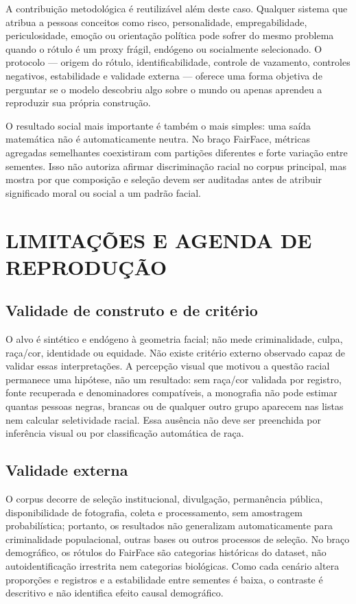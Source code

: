 A contribuição metodológica é reutilizável além deste caso. Qualquer sistema que atribua a pessoas conceitos como risco, personalidade, empregabilidade, periculosidade, emoção ou orientação política pode sofrer do mesmo problema quando o rótulo é um proxy frágil, endógeno ou socialmente selecionado. O protocolo --- origem do rótulo, identificabilidade, controle de vazamento, controles negativos, estabilidade e validade externa --- oferece uma forma objetiva de perguntar se o modelo descobriu algo sobre o mundo ou apenas aprendeu a reproduzir sua própria construção.

O resultado social mais importante é também o mais simples: uma saída matemática não é automaticamente neutra. No braço FairFace, métricas agregadas semelhantes coexistiram com partições diferentes e forte variação entre sementes. Isso não autoriza afirmar discriminação racial no corpus principal, mas mostra por que composição e seleção devem ser auditadas antes de atribuir significado moral ou social a um padrão facial.

\chapter{LIMITAÇÕES E AGENDA DE REPRODUÇÃO}

\section{Validade de construto e de critério}

O alvo é sintético e endógeno à geometria facial; não mede criminalidade, culpa, raça/cor, identidade ou equidade. Não existe critério externo observado capaz de validar essas interpretações. A percepção visual que motivou a questão racial permanece uma hipótese, não um resultado: sem raça/cor validada por registro, fonte recuperada e denominadores compatíveis, a monografia não pode estimar quantas pessoas negras, brancas ou de qualquer outro grupo aparecem nas listas nem calcular seletividade racial. Essa ausência não deve ser preenchida por inferência visual ou por classificação automática de raça.

\section{Validade externa}

O corpus decorre de seleção institucional, divulgação, permanência pública, disponibilidade de fotografia, coleta e processamento, sem amostragem probabilística; portanto, os resultados não generalizam automaticamente para criminalidade populacional, outras bases ou outros processos de seleção. No braço demográfico, os rótulos do FairFace são categorias históricas do dataset, não autoidentificação irrestrita nem categorias biológicas. Como cada cenário altera proporções e registros e a estabilidade entre sementes é baixa, o contraste é descritivo e não identifica efeito causal demográfico.

